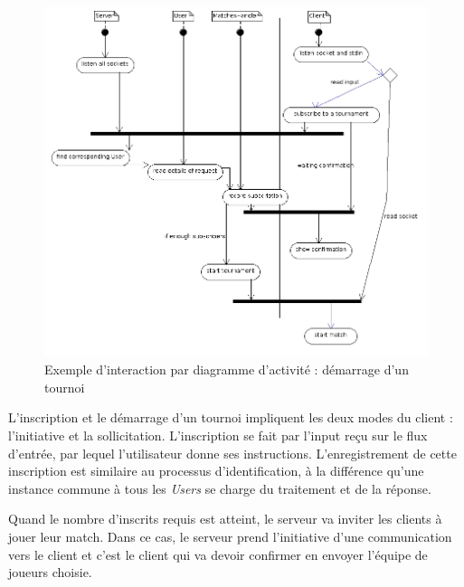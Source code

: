 \documentclass[a4paper,titlepage]{scrreprt}
\begin{document}
    \begin{figure}[H]
    \center
    \includegraphics[scale=0.4]{uml/Activity_Tournamentmatch.png}
    \caption{Exemple d'interaction par diagramme d'activité : démarrage d'un tournoi} \label{diag-tournament}
    \end{figure}
    L'inscription et le démarrage d'un tournoi impliquent les deux modes du client : l'initiative et la sollicitation.
    L'inscription se fait par l'input reçu sur le flux d'entrée, par lequel l'utilisateur donne ses instructions.
    L'enregistrement de cette inscription est similaire au processus d'identification, à la différence
    qu'une instance commune à tous les \emph{Users} se charge du traitement et de la réponse.
    
    Quand le nombre d'inscrits requis est atteint, le serveur va inviter les clients à jouer leur match.
    Dans ce cas, le serveur prend l'initiative d'une communication vers le client et c'est le client
    qui va devoir confirmer en envoyer l'équipe de joueurs choisie.
    
    
\end{document}
